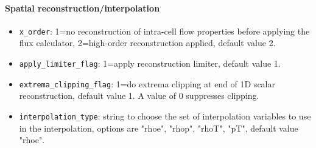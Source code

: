 \paragraph{Spatial reconstruction/interpolation}
\begin{itemize}
\item \texttt{x\_order}\ddag: 1=no reconstruction of intra-cell flow properties
  before applying the flux calculator, 2=high-order reconstruction applied, 
  default value 2.
\item \texttt{apply\_limiter\_flag}: 1=apply reconstruction limiter, default value 1.
\item \texttt{extrema\_clipping\_flag}: 1=do extrema clipping at end of 1D scalar reconstruction,
  default value 1.  A value of 0 suppresses clipping.
\item \texttt{interpolation\_type}: string to choose the set of interpolation variables
  to use in the interpolation, options are "rhoe", "rhop", "rhoT", "pT", default value "rhoe".
\end{itemize}

